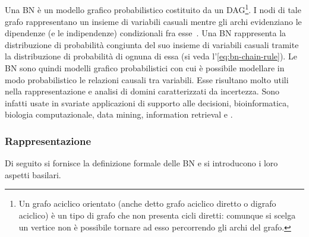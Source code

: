\subsection{\bn{}}
\label{sec:bn}
Una \acl{BN} è un modello grafico probabilistico costituito da un \acf{DAG}\footnote{Un grafo aciclico orientato (anche detto grafo aciclico diretto o digrafo aciclico) è un tipo di grafo che non presenta cicli diretti: comunque si scelga un vertice non è possibile tornare ad esso percorrendo gli archi del grafo.}. I nodi di tale grafo rappresentano un insieme di variabili casuali mentre gli archi evidenziano le dipendenze (e le indipendenze) condizionali fra esse~\citep{Korb2011}.
Una \acs{BN} rappresenta la distribuzione di probabilità congiunta del suo insieme di variabili casuali tramite la distribuzione di probabilità \cond*{} di ognuna di essa (si veda l'\autoref{eq:bn-chain-rule}).
Le \acs{BN} sono quindi modelli grafico probabilistici con cui è possibile modellare in modo probabilistico le relazioni causali tra variabili. Esse risultano molto utili nella rappresentazione e analisi di domini caratterizzati da incertezza. Sono infatti usate in svariate applicazioni di supporto alle decisioni, bioinformatica, biologia computazionale, data mining, information retrieval e .

\subsubsection{Rappresentazione}
Di seguito si fornisce la definizione formale delle \acl{BN} e si introducono i loro aspetti basilari.

